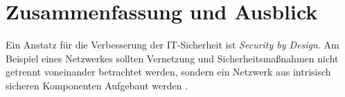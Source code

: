 \chapter{Zusammenfassung und Ausblick}

Ein Anstatz für die Verbesserung der IT-Sicherheit ist \emph{Security by Design}. Am Beispiel eines Netzwerkes sollten Vernetzung und Sicherheitsmaßnahmen nicht getrennt voneinander betrachtet werden, sondern ein Netzwerk aus intrisisch sicheren Komponenten Aufgebaut werden \cite{nicholson2018blurring}.